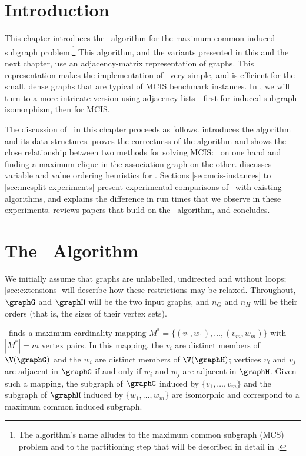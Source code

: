 \section{Introduction}

This chapter introduces the \McSplit\ algorithm for the
maximum common induced subgraph
problem.\footnote{The algorithm's name alludes to the maximum common subgraph
(MCS) problem and to the partitioning step that will be described in detail
in .}
This algorithm, and the
variants presented in this and the next chapter, use an adjacency-matrix
representation of graphs. This representation makes the implementation of
\McSplit\ very simple, and is efficient for the small, dense graphs that are
typical of MCIS benchmark instances.  
In , we will turn to a more intricate version using
adjacency lists---first for induced subgraph isomorphism, then for
MCIS.

The discussion of \McSplit\ in this chapter proceeds as follows.
 introduces the algorithm and its data structures.
 proves the correctness of the algorithm
and shows the close relationship between two methods for solving
MCIS: \McSplit\ on one hand and
finding a maximum clique in the association graph on the other.
 discusses variable and value ordering
heuristics for \McSplit.
Sections \ref{sec:mcis-instances} 
to \ref{sec:mcsplit-experiments}
present experimental comparisons of
\McSplit\ with existing algorithms, and
 explains the difference in run times that
we observe in these experiments.
 reviews papers that build on the \McSplit\
algorithm, and  concludes.

\section{The \McSplit\ Algorithm \label{sec:mcsplit}}

We initially assume that graphs are unlabelled, undirected and without loops;
\cref{sec:extensions} will describe how these restrictions may be relaxed.
Throughout, $\graphG$ and $\graphH$ will be the two input graphs, and
$n_G$ and $n_H$ will be their orders (that is, the sizes of their vertex sets).

\McSplit\
finds a maximum-cardinality mapping $M^* = \{(v_1, w_1), \dots, (v_{m},
w_{m})\}$ with $|M^*| = m$ vertex pairs.
In this mapping, the $v_i$ are distinct members of
$\V(\graphG)$ and the $w_i$ are distinct members of $\V(\graphH)$;
vertices $v_i$ and $v_j$ are adjacent in $\graphG$ if and only if $w_i$ and $w_j$
are adjacent in $\graphH$.  Given such a mapping, the subgraph of $\graphG$
induced by $\{v_1, \dots, v_{m}\}$ and the subgraph of $\graphH$ induced by
$\{w_1, \dots, w_{m}\}$ are isomorphic and correspond to a maximum common
induced subgraph.

